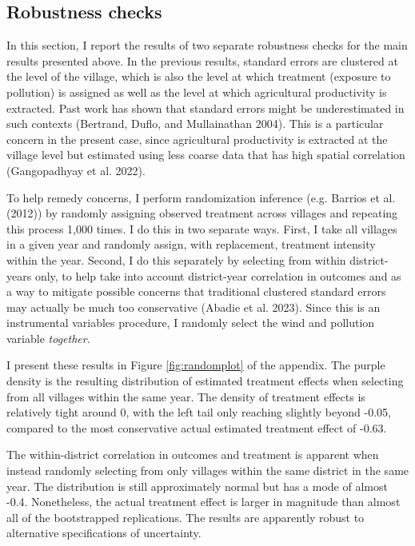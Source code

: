 \documentclass[
]{article}
\begin{document}
\hypertarget{robustness-checks}{%
\subsection{Robustness checks}\label{robustness-checks}}

In this section, I report the results of two separate robustness checks for the main results presented above. In the previous results, standard errors are clustered at the level of the village, which is also the level at which treatment (exposure to pollution) is assigned as well as the level at which agricultural productivity is extracted. Past work has shown that standard errors might be underestimated in such contexts (Bertrand, Duflo, and Mullainathan 2004). This is a particular concern in the present case, since agricultural productivity is extracted at the village level but estimated using less coarse data that has high spatial correlation (Gangopadhyay et al. 2022).

To help remedy concerns, I perform randomization inference (e.g. Barrios et al. (2012)) by randomly assigning observed treatment across villages and repeating this process 1,000 times. I do this in two separate ways. First, I take all villages in a given year and randomly assign, with replacement, treatment intensity within the year. Second, I do this separately by selecting from within district-years only, to help take into account district-year correlation in outcomes and as a way to mitigate possible concerns that traditional clustered standard errors may actually be much too conservative (Abadie et al. 2023). Since this is an instrumental variables procedure, I randomly select the wind and pollution variable \emph{together}.

I present these results in Figure \ref{fig:randomplot} of the appendix. The purple density is the resulting distribution of estimated treatment effects when selecting from all villages within the same year. The density of treatment effects is relatively tight around 0, with the left tail only reaching slightly beyond -0.05, compared to the most conservative actual estimated treatment effect of -0.63.

The within-district correlation in outcomes and treatment is apparent when instead randomly selecting from only villages within the same district in the same year. The distribution is still approximately normal but has a mode of almost -0.4. Nonetheless, the actual treatment effect is larger in magnitude than almost all of the bootstrapped replications. The results are apparently robust to alternative specifications of uncertainty.
\end{document}
